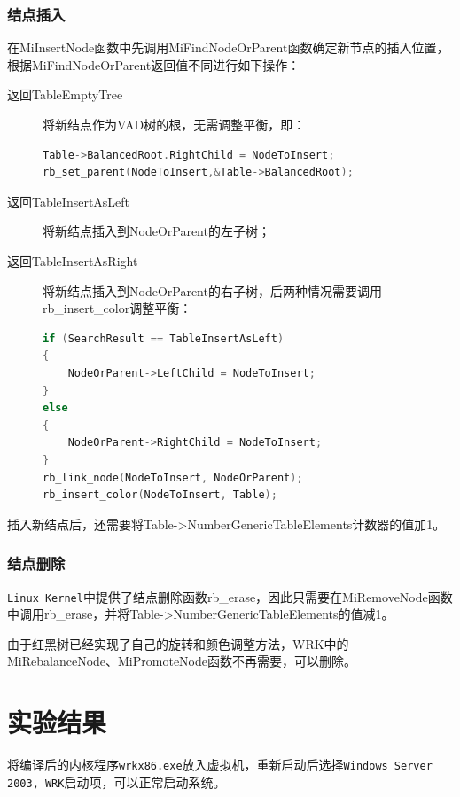 \documentclass[a4paper, 11pt]{article}
\begin{document}
            \subsubsection{结点插入}
                在MiInsertNode函数中先调用MiFindNodeOrParent函数确定新节点的插入位置，根据MiFindNodeOrParent返回值不同进行如下操作：
                \begin{description}
                  \item[返回TableEmptyTree] 将新结点作为VAD树的根，无需调整平衡，即：
\begin{lstlisting}[language={C}]
Table->BalancedRoot.RightChild = NodeToInsert;
rb_set_parent(NodeToInsert,&Table->BalancedRoot);
\end{lstlisting}
                  \item[返回TableInsertAsLeft] 将新结点插入到NodeOrParent的左子树；
                  \item[返回TableInsertAsRight] 将新结点插入到NodeOrParent的右子树，后两种情况需要调用rb\_insert\_color调整平衡：
\begin{lstlisting}[language={C}]
if (SearchResult == TableInsertAsLeft)
{
	NodeOrParent->LeftChild = NodeToInsert;
}
else
{
	NodeOrParent->RightChild = NodeToInsert;
}
rb_link_node(NodeToInsert, NodeOrParent);
rb_insert_color(NodeToInsert, Table);
\end{lstlisting}
                \end{description}
                
                插入新结点后，还需要将Table->NumberGenericTableElements计数器的值加1。
            
            \subsubsection{结点删除}
                \texttt{Linux Kernel}中提供了结点删除函数rb\_erase，因此只需要在MiRemoveNode函数中调用rb\_erase，并将Table->NumberGenericTableElements的值减1。
                
                由于红黑树已经实现了自己的旋转和颜色调整方法，WRK中的MiRebalanceNode、MiPromoteNode函数不再需要，可以删除。

    \section{实验结果}
        将编译后的内核程序\texttt{wrkx86.exe}放入虚拟机，重新启动后选择\texttt{Windows Server 2003, WRK}启动项，可以正常启动系统。
\end{document}
